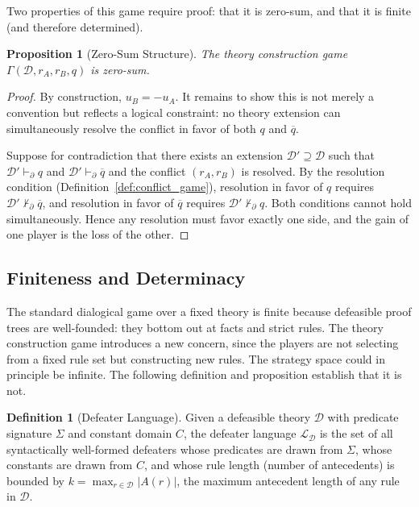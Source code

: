 \documentclass{article}
\newtheorem{proposition}[theorem]{Proposition}
\theoremstyle{definition}
\newtheorem{definition}[theorem]{Definition}
\newcommand{\D}{\mathcal{D}}
\newcommand{\pPartial}{\vdash_{\partial}}
\newcommand{\comp}[1]{\overline{#1}}
\begin{document}
Two properties of this game require proof: that it is zero-sum, and that it is finite (and therefore determined).

\begin{proposition}[Zero-Sum Structure]\label{prop:zerosum}
The theory construction game $\Gamma(\D, r_A, r_B, q)$ is zero-sum.
\end{proposition}

\begin{proof}
By construction, $u_B = -u_A$. It remains to show this is not merely a convention but reflects a logical constraint: no theory extension can simultaneously resolve the conflict in favor of both $q$ and $\comp{q}$.

Suppose for contradiction that there exists an extension $\D' \supseteq \D$ such that $\D' \pPartial q$ and $\D' \pPartial \comp{q}$ and the conflict $(r_A, r_B)$ is resolved. By the resolution condition (Definition~\ref{def:conflict_game}), resolution in favor of $q$ requires $\D' \not\pPartial \comp{q}$, and resolution in favor of $\comp{q}$ requires $\D' \not\pPartial q$. Both conditions cannot hold simultaneously. Hence any resolution must favor exactly one side, and the gain of one player is the loss of the other.
\end{proof}

\subsection{Finiteness and Determinacy}

The standard dialogical game over a fixed theory is finite because defeasible proof trees are well-founded: they bottom out at facts and strict rules. The theory construction game introduces a new concern, since the players are not selecting from a fixed rule set but constructing new rules. The strategy space could in principle be infinite. The following definition and proposition establish that it is not.

\begin{definition}[Defeater Language]\label{def:defeater_language}
Given a defeasible theory $\D$ with predicate signature $\Sigma$ and constant domain $C$, the defeater language $\mathcal{L}_\D$ is the set of all syntactically well-formed defeaters whose predicates are drawn from $\Sigma$, whose constants are drawn from $C$, and whose rule length (number of antecedents) is bounded by $k = \max_{r \in \D} |A(r)|$, the maximum antecedent length of any rule in $\D$.
\end{definition}
\end{document}
